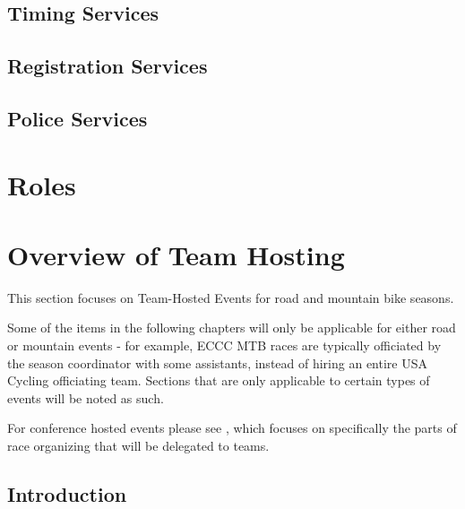 \documentclass[
  letterpaper, %
  fontsize=10pt, %
  twoside=true,
  chapterentrydots=true, %
  numbers=noenddot,
  fontmethod=tex,
]{kaobook}
\begin{document}
\section{Timing Services}

\section{Registration Services}

\section{Police Services}

\setchapterpreamble[u]{\margintoc}
\chapter{Roles}



\setchapterpreamble[u]{\margintoc}
\chapter{Overview of Team Hosting}

\begin{kaobox}[title=Scope]
This section focuses on
Team-Hosted Events %
for road and mountain bike seasons.

Some of the items in the following chapters will only be applicable
for either road or mountain events - for example, ECCC MTB races are typically
officiated by the season coordinator with some assistants, instead of hiring an
entire USA Cycling officiating team.
Sections that are only applicable to certain types of events will be noted as such.

For conference hosted events %
please see ,
which focuses on specifically the parts of race organizing
that will be delegated to teams.
\end{kaobox}

\section{Introduction}
\end{document}
